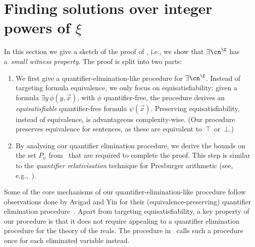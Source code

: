 \section{Finding solutions over integer powers of \texorpdfstring{$\xi$}{the base}}
\label{sec:solving-substructure}

In this section we give a sketch of the proof of
, i.e., we show that $\exists
\ipow{\cn}$ has a~\emph{small witness property}. The proof is split into two parts:
\begin{enumerate}
  \item We first give a quantifier-elimination-like procedure for $\exists
  \ipow{\cn}$. Instead of targeting formula equivalence, we only focus on
  equisatisfiability: given a formula $\exists y\, \phi(y,\vec{x})$, with $\phi$
  quantifier-free, the procedure derives an \emph{equisatisfiable}
  quantifier-free formula $\psi(\vec x)$. Preserving
  equisatisfiability, instead of equivalence, is advantageous complexity-wise.
  (Our procedure
  preserves equivalence for sentences, as
  these are equivalent to~$\top$~or~$\bot$.)
  \item By analysing our quantifier elimination procedure, we derive the bounds
  on the set $P_{\psi}$ from~ that are required to
  complete the proof. This step is similar to the \emph{quantifier
  relativisation} technique for Presburger arithmetic (see, e.g.,~\cite[Theorem
  2.2]{Weispfenning90}).
\end{enumerate}
Some of the core mechanisms of our quantifier-elimination-like procedure follow
observations done by Avigad and Yin for their (equivalence-preserving) quantifier elimination
procedure~\cite{AvigadY07}. Apart from targeting equisatisfiability, a key property of our procedure is that it does not require
appealing to a quantifier elimination procedure for the theory of the reals. The
procedure in~\cite{AvigadY07} calls such a procedure once for each eliminated
variable instead.

